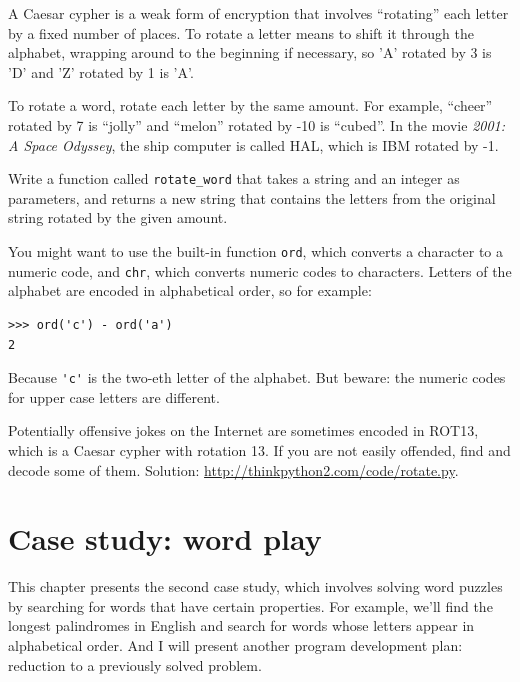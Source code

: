 \documentclass[10pt]{book}
\begin{document}
\begin{exercise}

\label{exrotate}
A Caesar cypher is a weak form of encryption that involves ``rotating'' each
letter by a fixed number of places.  To rotate a letter means
to shift it through the alphabet, wrapping around to the beginning if
necessary, so 'A' rotated by 3 is 'D' and 'Z' rotated by 1 is 'A'.

To rotate a word, rotate each letter by the same amount.
For example, ``cheer'' rotated by 7 is ``jolly'' and ``melon'' rotated
by -10 is ``cubed''.  In the movie {\em 2001: A Space Odyssey}, the
ship computer is called HAL, which is IBM rotated by -1.


Write a function called \verb"rotate_word"
that takes a string and an integer as parameters, and returns
a new string that contains the letters from the original string
rotated by the given amount.

You might want to use the built-in function {\tt ord}, which converts
a character to a numeric code, and {\tt chr}, which converts numeric
codes to characters.  Letters of the alphabet are encoded in alphabetical
order, so for example:

\begin{verbatim}
>>> ord('c') - ord('a')
2
\end{verbatim}

Because \verb"'c'" is the two-eth letter of the alphabet.  But
beware: the numeric codes for upper case letters are different.

Potentially offensive jokes on the Internet are sometimes encoded in
ROT13, which is a Caesar cypher with rotation 13.  If you are not
easily offended, find and decode some of them.  Solution:
\url{http://thinkpython2.com/code/rotate.py}.

\end{exercise}


\chapter{Case study: word play}
\label{wordplay}

This chapter presents the second case study, which involves
solving word puzzles by searching for words that have certain
properties.  For example, we'll find the longest palindromes
in English and search for words whose letters appear in
alphabetical order.  And I will present another program development
plan: reduction to a previously solved problem.
\end{document}
